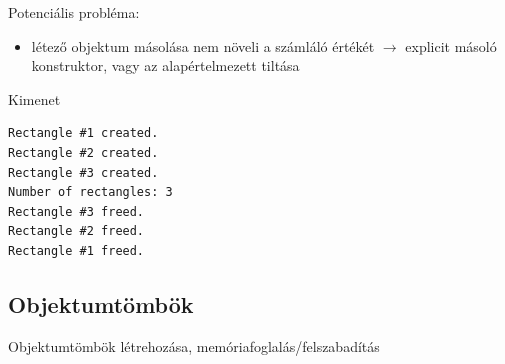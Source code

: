 \documentclass[usenames,dvipsnames,aspectratio=169]{beamer}
\begin{document}
\begin{frame}
    \begin{exampleblock}{}
        \vspace{-.3cm}
        \scriptsize
        
        
        \vspace{-.3cm}
    \end{exampleblock}
\end{frame}

\begin{frame}
    Potenciális probléma:
    \begin{itemize}
        \item létező objektum másolása nem növeli a számláló értékét $\rightarrow$ explicit másoló konstruktor, vagy az alapértelmezett tiltása
    \end{itemize}
\end{frame}

\begin{frame}[fragile]
    \begin{exampleblock}{}
        \scriptsize
        
    \end{exampleblock}
    \begin{block}{Kimenet}
        \scriptsize
        \vspace{-.3cm}
        \begin{verbatim}
Rectangle #1 created.
Rectangle #2 created.
Rectangle #3 created.
Number of rectangles: 3
Rectangle #3 freed.
Rectangle #2 freed.
Rectangle #1 freed.
\end{verbatim}
\vspace{-.3cm}
    \end{block}
\end{frame}

\subsection{Objektumtömbök}

\begin{frame}
    Objektumtömbök létrehozása, memóriafoglalás/felszabadítás
    \begin{exampleblock}{}
        \scriptsize
        
    \end{exampleblock}
\end{frame}
\end{document}
